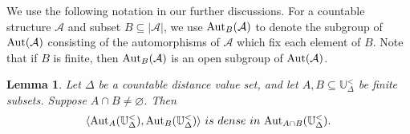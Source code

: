 \documentclass[10pt,a4paper]{amsart}
\newtheorem{lemma}[theorem]{Lemma}
\theoremstyle{definition}
\theoremstyle{remark}
\begin{document}
We use the following notation in our further discussions. For a countable structure $\mathcal{A}$ and subset $B \subseteq |\mathcal{A}|$, we use ${\rm Aut}_B(\mathcal{A})$ to denote the subgroup of $\mbox{\rm Aut}(\mathcal{A})$ consisting of the automorphisms of $\mathcal{A}$ which fix each element of $B$. Note that if $B$ is finite, then ${\rm Aut}_B(\mathcal{A})$ is an open subgroup of $\mbox{\rm Aut}(\mathcal{A})$. 

     \begin{lemma}\label{lemma:density}
        Let $\Delta$ be a countable distance value set, and let $A,B \subseteq \mathbb{U}_{\Delta}^<$ be finite subsets. Suppose $A \cap B \neq \varnothing$. Then \[\langle{\rm Aut}_A(\mathbb{U}_\Delta^<), {\rm Aut}_B(\mathbb{U}_\Delta^<) \rangle\ is \ dense \ in \ {\rm Aut}_{A\cap B}(\mathbb{U}_\Delta^<). \]
     \end{lemma}
\end{document}
